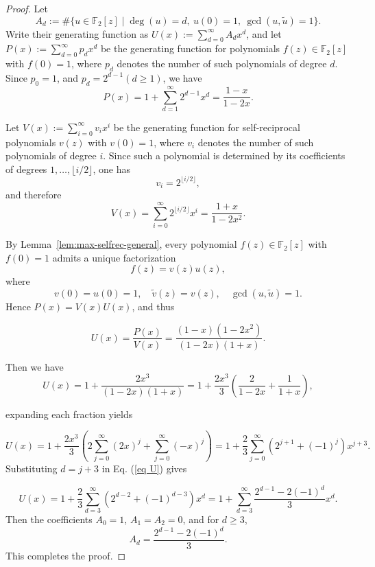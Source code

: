 \documentclass[hidelinks,onefignum,onetabnum]{siamart251216}
\theoremstyle{definition}
\theoremstyle{remark}
\begin{document}
\begin{proof}
	Let
	\[
	A_d:=\#\{u\in \mathbb F_2[z]\mid \deg(u)=d,\ u(0)=1,\ \gcd(u,\widetilde{u})=1\}.
	\]
	Write their generating function as $U(x):=\displaystyle\sum_{d=0}^{\infty}A_d x^d$, and let $P(x):=\displaystyle\sum_{d=0}^{\infty}p_d x^d$ be the generating function for polynomials $f(z)\in \mathbb F_2[z]$ with $f(0)=1$, where $p_d$
	denotes the number of such polynomials of degree $d$. Since $	p_0=1$, and $p_d=2^{d-1} (d\ge 1)$, we have
	\[
	P(x)=1+\sum_{d=1}^{\infty}2^{d-1}x^d=\frac{1-x}{1-2x}.
	\]
	
	Let $V(x):=\displaystyle\sum_{i=0}^{\infty}v_i x^i$ be the generating function for self-reciprocal polynomials $v(z)$ with $v(0)=1$, where $v_i$ denotes the number of such polynomials of degree $i$. Since such a polynomial is determined by its coefficients of degrees $1,\dots,\lfloor i/2\rfloor$, one has
	\[
	v_i=2^{\lfloor i/2\rfloor},
	\]
	and therefore
	\[
	V(x)=\sum_{i=0}^{\infty}2^{\lfloor i/2\rfloor}x^i=\frac{1+x}{1-2x^2}.
	\]
	
	By Lemma~\ref{lem:max-selfrec-general}, every polynomial $f(z)\in \mathbb F_2[z]$ with $f(0)=1$
	admits a unique factorization
	\[
	f(z)=v(z)u(z),
	\]
	where
	\[
	v(0)=u(0)=1,\quad \widetilde{v}(z)=v(z),\quad \gcd(u,\widetilde{u})=1.
	\]
	Hence $P(x)=V(x)U(x)$, and thus
	
	\begin{equation}\label{eq 2x3}
	U(x)=\frac{P(x)}{V(x)}
	=\frac{(1-x)(1-2x^2)}{(1-2x)(1+x)}.
	\end{equation}
	
Then we have
\begin{equation}
U(x) = 1 + \frac{2x^3}{(1-2x)(1+x)} = 1 + \frac{2x^3}{3}\left(\frac{2}{1-2x} + \frac{1}{1+x}\right),
\end{equation}

expanding each fraction yields

\begin{equation}\label{eq U}
U(x)=1+\frac{2x^3}{3}\left(2\sum_{j=0}^{\infty}(2x)^j+\sum_{j=0}^{\infty}(-x)^j\right)
=1+\frac{2}{3}\sum_{j=0}^{\infty}\left(2^{j+1}+(-1)^{j}\right)x^{j+3}.
\end{equation}
Substituting $d=j+3$ in Eq. (\ref{eq U}) gives


\begin{equation}
U(x)=1+\frac{2}{3}\sum_{d=3}^{\infty}\left(2^{d-2}+(-1)^{d-3}\right)x^{d}=1+\sum_{d=3}^{\infty}\frac{2^{d-1}-2(-1)^{d}}{3}x^d.
\end{equation} 
Then the coefficients $A_0=1$, $A_1=A_2=0$, and for $d\ge 3$,
\[
A_d=\frac{2^{d-1}-2(-1)^{d}}{3}.
\]
 This completes the proof.

\end{proof}
\end{document}

